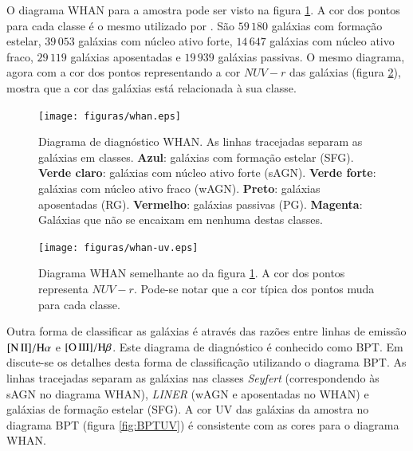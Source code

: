 O diagrama WHAN para a amostra \starlightUV pode ser visto na figura
\ref{fig:Whan}. A cor dos pontos para cada classe é o mesmo utilizado por
\citet{CidFernandes2011}. São $59\,180$ galáxias com formação estelar, $39\,053$
galáxias com núcleo ativo forte, $14\,647$ galáxias com núcleo ativo fraco,
$29\,119$ galáxias aposentadas e $19\,939$ galáxias passivas. O mesmo diagrama,
agora com a cor dos pontos representando a cor $NUV-r$ das galáxias (figura
\ref{fig:WhanUV}), mostra que a cor das galáxias está relacionada à sua classe.

\begin{figure}
	\texttt{[image: figuras/whan.eps]}
	\caption[Diagrama de diagnóstico WHAN.]
	{Diagrama de diagnóstico WHAN. As linhas tracejadas separam as galáxias
	em classes. \textbf{Azul}: galáxias com formação estelar (SFG). \textbf{Verde
	claro}: galáxias com núcleo ativo forte (sAGN). \textbf{Verde forte}:
	galáxias com núcleo ativo fraco (wAGN). \textbf{Preto}: galáxias aposentadas
	(RG). \textbf{Vermelho}: galáxias passivas (PG). \textbf{Magenta}: Galáxias
	que não se encaixam em nenhuma destas classes.}
	\label{fig:Whan}
\end{figure}

\begin{figure}
	\texttt{[image: figuras/whan-uv.eps]}
	\caption[Cores ultravioleta no diagrama WHAN.]
	{Diagrama WHAN semelhante ao da figura \ref{fig:Whan}. A cor dos pontos
	representa $NUV-r$. Pode-se notar que a cor típica dos pontos muda para cada
	classe.\fixme}
	\label{fig:WhanUV}
\end{figure}

Outra forma de classificar as galáxias é através das razões entre linhas de
emissão $\nII/\Halpha$ e $\oIII/\Hbeta$. Este diagrama de diagnóstico é
conhecido como BPT. Em \citet{CidFernandes2010} discute-se os detalhes desta
forma de classificação utilizando o diagrama BPT. As linhas tracejadas separam
as galáxias nas classes {\em Seyfert} (correspondendo às sAGN no diagrama WHAN),
{\em LINER} (wAGN e aposentadas no WHAN) e galáxias de formação estelar (SFG). A
cor UV das galáxias da amostra no diagrama BPT (figura \ref{fig:BPTUV}) é
consistente com as cores para o diagrama WHAN.

